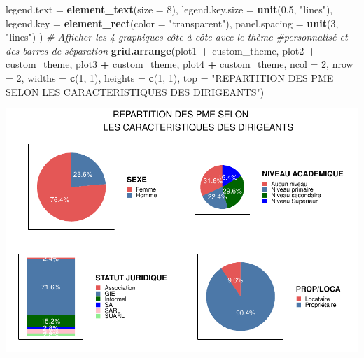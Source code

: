 \documentclass[
]{article}
\newenvironment{Shaded}{\begin{snugshade}}{\end{snugshade}}
\newcommand{\AttributeTok}[1]{\textcolor[rgb]{0.13,0.29,0.53}{#1}}
\newcommand{\CommentTok}[1]{\textcolor[rgb]{0.56,0.35,0.01}{\textit{#1}}}
\newcommand{\DecValTok}[1]{\textcolor[rgb]{0.00,0.00,0.81}{#1}}
\newcommand{\FloatTok}[1]{\textcolor[rgb]{0.00,0.00,0.81}{#1}}
\newcommand{\FunctionTok}[1]{\textcolor[rgb]{0.13,0.29,0.53}{\textbf{#1}}}
\newcommand{\NormalTok}[1]{#1}
\newcommand{\SpecialCharTok}[1]{\textcolor[rgb]{0.81,0.36,0.00}{\textbf{#1}}}
\newcommand{\StringTok}[1]{\textcolor[rgb]{0.31,0.60,0.02}{#1}}
\begin{document}
\begin{Shaded}
\begin{Highlighting}[]
  \AttributeTok{legend.text =} \FunctionTok{element\_text}\NormalTok{(}\AttributeTok{size =} \DecValTok{8}\NormalTok{),}
  \AttributeTok{legend.key.size =} \FunctionTok{unit}\NormalTok{(}\FloatTok{0.5}\NormalTok{, }\StringTok{"lines"}\NormalTok{),}
  \AttributeTok{legend.key =} \FunctionTok{element\_rect}\NormalTok{(}\AttributeTok{color =} \StringTok{"transparent"}\NormalTok{),}
  \AttributeTok{panel.spacing =} \FunctionTok{unit}\NormalTok{(}\DecValTok{3}\NormalTok{, }\StringTok{"lines"}\NormalTok{)}
\NormalTok{)}
\CommentTok{\# Afficher les 4 graphiques côte à côte avec le thème }
\CommentTok{\#personnalisé et des barres de séparation}
\FunctionTok{grid.arrange}\NormalTok{(plot1 }\SpecialCharTok{+}\NormalTok{ custom\_theme, plot2 }\SpecialCharTok{+}\NormalTok{ custom\_theme, }
\NormalTok{             plot3 }\SpecialCharTok{+}\NormalTok{ custom\_theme, plot4 }\SpecialCharTok{+}\NormalTok{ custom\_theme, }
             \AttributeTok{ncol =} \DecValTok{2}\NormalTok{, }\AttributeTok{nrow =} \DecValTok{2}\NormalTok{, }\AttributeTok{widths =} \FunctionTok{c}\NormalTok{(}\DecValTok{1}\NormalTok{, }\DecValTok{1}\NormalTok{), }\AttributeTok{heights =} \FunctionTok{c}\NormalTok{(}\DecValTok{1}\NormalTok{, }\DecValTok{1}\NormalTok{), }
             \AttributeTok{top =} \StringTok{"REPARTITION DES PME SELON }
\StringTok{             LES CARACTERISTIQUES DES DIRIGEANTS"}\NormalTok{)}
\end{Highlighting}
\end{Shaded}

\begin{center}\includegraphics{Projet_R_ISE_1_files/figure-latex/unnamed-chunk-19-1} \end{center}
\end{document}
